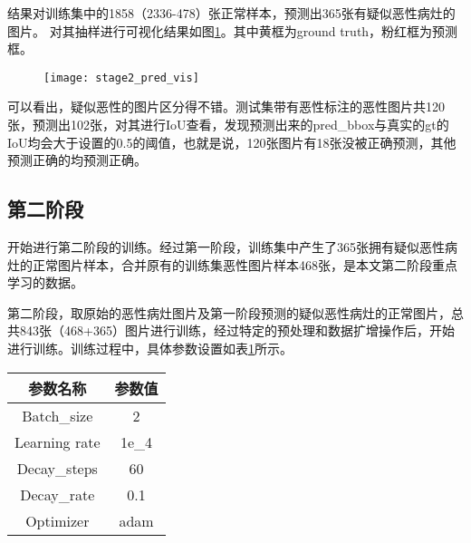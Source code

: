 结果对训练集中的1858（2336-478）张正常样本，预测出365张有疑似恶性病灶的图片。
对其抽样进行可视化结果如图\ref{fig:stage2_pred_vis}。其中黄框为ground truth，粉红框为预测框。
\begin{figure}[!htbp]
    \centering
    \texttt{[image: stage2\_pred\_vis]}
    \label{fig:stage2_pred_vis}
\end{figure}
可以看出，疑似恶性的图片区分得不错。测试集带有恶性标注的恶性图片共120张，预测出102张，对其进行IoU查看，发现预测出来的pred\_bbox与真实的gt的IoU均会大于设置的0.5的阈值，也就是说，120张图片有18张没被正确预测，其他预测正确的均预测正确。

\subsection{第二阶段}
开始进行第二阶段的训练。经过第一阶段，训练集中产生了365张拥有疑似恶性病灶的正常图片样本，合并原有的训练集恶性图片样本468张，是本文第二阶段重点学习的数据。

第二阶段，取原始的恶性病灶图片及第一阶段预测的疑似恶性病灶的正常图片，总共843张（468+365）图片进行训练，经过特定的预处理和数据扩增操作后，开始进行训练。训练过程中，具体参数设置如表\ref{tab:2_stage_2_training_config}所示。
\begin{table}[!htbp]
    \label{tab:2_stage_2_training_config}
    \centering
    \footnotesize%
    \setlength{\tabcolsep}{4pt}%
    \renewcommand{\arraystretch}{1.2}%
    \begin{tabular}{cc}
        \hline
        参数名称& 参数值\\
        \hline
        Batch\_size & 2\\
        Learning rate& 1e\_4\\
        Decay\_steps & 60\\
        Decay\_rate & 0.1\\
        Optimizer& adam\\
        \hline
    \end{tabular}
\end{table}


